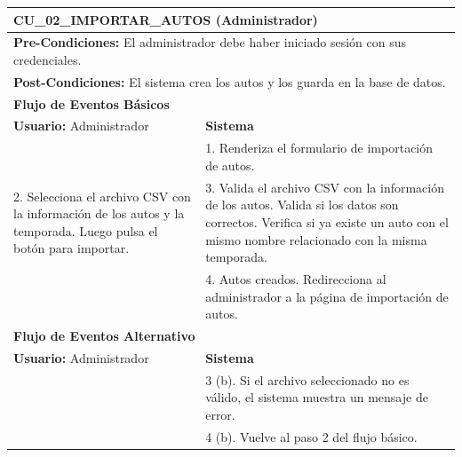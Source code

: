 %
%

\begin{center}
  \begin{tabular}{| p{7.5cm} | p{7.5cm} |}
    \hline
    \multicolumn{2}{|p{15cm}|}{\textbf{CU\_02\_IMPORTAR\_AUTOS} (Administrador)} \\ \hline
    \multicolumn{2}{|p{15cm}|}{\textbf{Pre-Condiciones:} El administrador debe haber iniciado sesión con sus credenciales.} \\ \hline
    \multicolumn{2}{|p{15cm}|}{\textbf{Post-Condiciones:} El sistema crea los autos y los guarda en la base de datos.} \\ \hline
    \multicolumn{2}{|p{7.5cm}|}{\textbf{Flujo de Eventos Básicos}} \\ \hline
    \multicolumn{1}{|p{7.5cm}|}{\textbf{Usuario:} Administrador} & \multicolumn{1}{|p{7.5cm}|}{\textbf{Sistema}} \\ \hline
    
    \multicolumn{1}{|p{7.5cm}|}{} & 
    \multicolumn{1}{|p{7.5cm}|}{1. Renderiza el formulario de importación de autos.}\\ \hline
    
    \multicolumn{1}{|p{7.5cm}|}{2. Selecciona el archivo CSV con la información de los autos y la temporada. Luego pulsa el botón para importar.}& 
    \multicolumn{1}{|p{7.5cm}|}{3. Valida el archivo CSV con la información de los autos. Valida si los datos son correctos. Verifica si ya existe un auto con el mismo nombre relacionado con la misma temporada.}\\ \hline
    
    \multicolumn{1}{|p{7.5cm}|}{} & 
    \multicolumn{1}{|p{7.5cm}|}{4. Autos creados. Redirecciona al administrador a la página de importación de autos.}\\ \hline
    
    \multicolumn{2}{|p{7.5cm}|}{\textbf{Flujo de Eventos Alternativo}} \\ \hline
    
    \multicolumn{1}{|p{7.5cm}|}{\textbf{Usuario:} Administrador} & \multicolumn{1}{|p{7.5cm}|}{\textbf{Sistema}} \\ \hline
    
    \multicolumn{1}{|p{7.5cm}|}{} & 
    \multicolumn{1}{|p{7.5cm}|}{3 (b). Si el archivo seleccionado no es válido, el sistema muestra un mensaje de error.}\\ \hline
    
    \multicolumn{1}{|p{7.5cm}|}{} & 
    \multicolumn{1}{|p{7.5cm}|}{4 (b). Vuelve al paso 2 del flujo básico.}\\ \hline
  \end{tabular}
\end{center}

